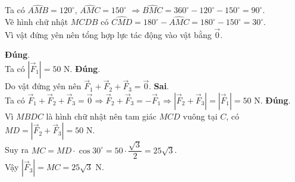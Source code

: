 \begin{ex}
{\begin{center}
		\end{center}
		Ta có $\widehat{AMB}=120^{\circ}$, $\widehat{AMC}=150^{\circ}$ $\Rightarrow \widehat{BMC}=360^{\circ}-120^{\circ}-150^{\circ}=90^{\circ}$.\\
		Vẽ hình chữ nhật $MCDB$ có $\widehat{CMD}=180^{\circ}-\widehat{AMC}=180^{\circ}-150^{\circ}=30^{\circ}$.\\
		Vì vật đứng yên nên tổng hợp lực tác động vào vật bằng $\overrightarrow{0}$.
		\begin{itemchoice}
			\itemch \textbf{Đúng}.\\ Ta có $\left|\overrightarrow{F}_1\right|=50$ N.
			\itemch \textbf{Đúng}.\\ Do vật đứng yên nên $\overrightarrow{F}_1+\overrightarrow{F}_2+\overrightarrow{F}_3=\overrightarrow{0}$.
			\itemch \textbf{Sai}.\\
			Ta có $\overrightarrow{F}_1 +\overrightarrow{F}_2 +\overrightarrow{F}_3 =\overrightarrow{0} \Rightarrow \overrightarrow{F}_2 +\overrightarrow{F}_3 =-\overrightarrow{F}_1 \Rightarrow \left|\overrightarrow{F}_2 +\overrightarrow{F}_3\right| = \left|\overrightarrow{F}_1\right| = 50$ N.
			\itemch \textbf{Đúng}.\\
			Vì $MBDC$ là hình chữ nhật nên tam giác $MCD$ vuông tại $C$, có $MD=\left|\overrightarrow{F}_2 + \overrightarrow{F}_3\right|=50$ N.\\
			Suy ra $MC=MD \cdot \cos 30^\circ =50 \cdot \dfrac{\sqrt{3}}{2}=25\sqrt{3}$.\\
			Vậy $\left|\overrightarrow{F}_3\right| =MC=25\sqrt{3}$ N.
		\end{itemchoice}
	}
\end{ex}

